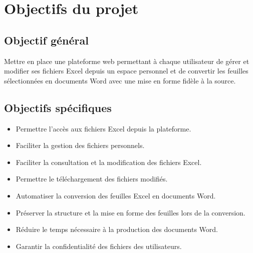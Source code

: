 \chapter{Objectifs du projet}

\section{Objectif général}

Mettre en place une plateforme web permettant à chaque utilisateur de gérer et modifier ses fichiers Excel depuis un espace personnel et de convertir les feuilles sélectionnées en documents Word avec une mise en forme fidèle à la source.

\section{Objectifs spécifiques}

\begin{itemize}
    \item Permettre l'accès aux fichiers Excel depuis la plateforme.
    \item Faciliter la gestion des fichiers personnels.
    \item Faciliter la consultation et la modification des fichiers Excel.
    \item Permettre le téléchargement des fichiers modifiés.
    \item Automatiser la conversion des feuilles Excel en documents Word.
    \item Préserver la structure et la mise en forme des feuilles lors de la conversion.
    \item Réduire le temps nécessaire à la production des documents Word.
    \item Garantir la confidentialité des fichiers des utilisateurs.
\end{itemize}
